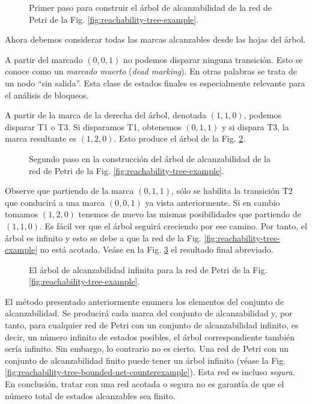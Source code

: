 \begin{figure}[!htb]
      \centering
      
      \caption{Primer paso para construir el árbol de alcanzabilidad
            de la red de Petri de la Fig. \ref{fig:reachability-tree-example}.}
      \label{fig:reachability-tree-step-1}
\end{figure}

Ahora debemos considerar todas las marcas alcanzables desde las hojas del árbol.

A partir del marcado $(0,0,1)$ no podemos disparar ninguna transición. Esto se conoce como un
\emph{marcado muerto} (\textit{dead marking}).
En otras palabras se trata de un nodo ``sin salida''.
Esta clase de estados finales es especialmente relevante para el análisis de bloqueos.

A partir de la marca de la derecha del árbol, denotada $(1, 1, 0)$, podemos disparar T1 o T3.
Si disparamos T1, obtenemos $(0, 1, 1)$ y si dispara T3, la marca resultante es $(1, 2, 0)$.
Esto produce el árbol de la Fig. \ref{fig:reachability-tree-step-2}.

\begin{figure}[!htb]
      \centering
      
      \caption{Segundo paso en la construcción del árbol de alcanzabilidad
            de la red de Petri de la Fig. \ref{fig:reachability-tree-example}.}
      \label{fig:reachability-tree-step-2}
\end{figure}

Observe que partiendo de la marca $(0, 1, 1)$, sólo se habilita la transición T2 que conducirá a una
marca $(0, 0, 1)$ ya vista anteriormente.
Si en cambio tomamos $(1, 2, 0)$ tenemos de nuevo las
mismas posibilidades que partiendo de $(1, 1, 0)$.
Es fácil ver que el árbol seguirá creciendo por ese
camino. Por tanto, el árbol es infinito y
esto se debe a que la red de la Fig. \ref{fig:reachability-tree-example} no está acotada.
Veáse en la Fig. \ref{fig:reachability-tree-final-step} el resultado final abreviado.

\begin{figure}[!htb]
      \centering
      
      \caption{El árbol de alcanzabilidad infinita para
            la red de Petri de la Fig. \ref{fig:reachability-tree-example}.}
      \label{fig:reachability-tree-final-step}
\end{figure}

El método presentado anteriormente enumera los elementos del conjunto de alcanzabilidad.
Se producirá cada marca del conjunto de alcanzabilidad y, por tanto, para cualquier red de Petri
con un conjunto de alcanzabilidad infinito, es decir, un número infinito de estados posibles, el
árbol correspondiente también sería infinito.
Sin embargo, lo contrario no es cierto. Una red de
Petri con un conjunto de alcanzabilidad finito puede tener un árbol infinito
(véase la Fig. \ref{fig:reachability-tree-bounded-net-counterexample}).
Esta red es incluso \emph{segura}.
En conclusión, tratar con una red acotada o segura no
es garantía de que el número total de estados alcanzables sea finito.

